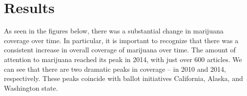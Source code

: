 


\section{Results}





As seen in the figures below, there was a substantial change in marijuana coverage over time. In particular, it is important to recognize that there was a consistent increase in overall coverage of marijuana over time. The amount of attention to marijuana reached its peak in 2014, with just over 600 articles. We can see that there are two dramatic peaks in coverage -- in 2010 and 2014, respectively. These peaks coincide with ballot initiatives California, Alaska, and Washington state. 






